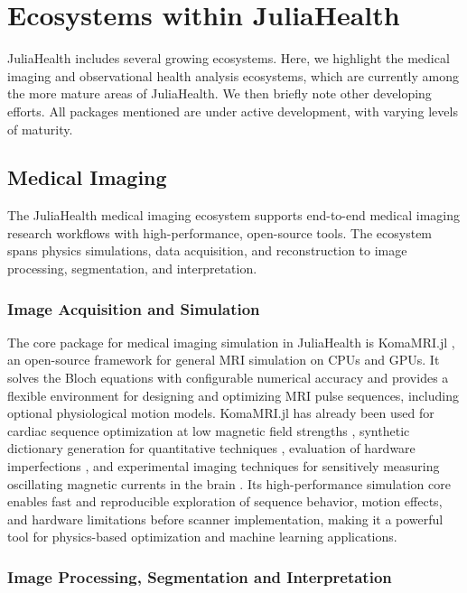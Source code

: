 \documentclass{juliacon}
\begin{document}
\section{Ecosystems within JuliaHealth}

JuliaHealth includes several growing ecosystems.
Here, we highlight the medical imaging and observational health analysis ecosystems, which are currently among the more mature areas of JuliaHealth.
We then briefly note other developing efforts.
All packages mentioned are under active development, with varying levels of maturity.

\subsection{Medical Imaging}

The JuliaHealth medical imaging ecosystem supports end-to-end medical imaging research workflows with high-performance, open-source tools.
The ecosystem spans physics simulations, data acquisition, and reconstruction to image processing, segmentation, and interpretation.

\subsubsection{Image Acquisition and Simulation}  

The core package for medical imaging simulation in JuliaHealth is KomaMRI.jl \cite{castillo-passi_komamri_2023}, an open-source framework for general MRI simulation on CPUs and GPUs.
It solves the Bloch equations with configurable numerical accuracy and provides a flexible environment for designing and optimizing MRI pulse sequences, including optional physiological motion models. \cite{villacorta-aylagas_versatile_2025}
KomaMRI.jl has already been used for cardiac sequence optimization at low magnetic field strengths \cite{castillo-passi_highly_2025, paredes_simultaneous_2025}, synthetic dictionary generation for quantitative techniques \cite{pedraza_cardiac_2025}, evaluation of hardware imperfections \cite{zhang_data_}, and experimental imaging techniques for sensitively measuring oscillating magnetic currents in the brain \cite{gregersen_increasing_}.
Its high-performance simulation core enables fast and reproducible exploration of sequence behavior, motion effects, and hardware limitations before scanner implementation, making it a powerful tool for physics-based optimization and machine learning applications.

\subsubsection{Image Processing, Segmentation and Interpretation}
\end{document}

